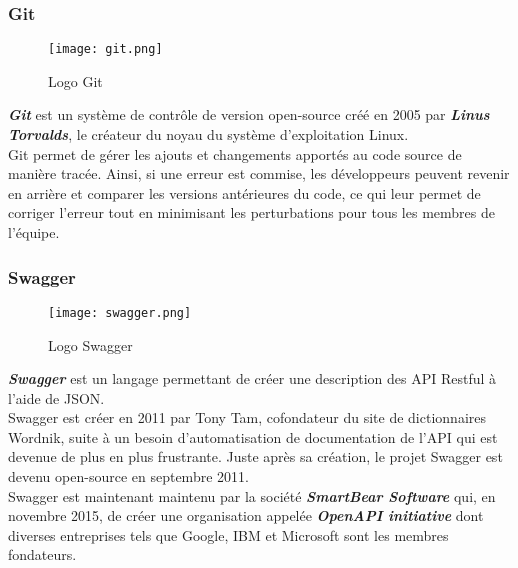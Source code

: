 \subsubsection{Git}
\vspace{1cm}
\begin{figure}[H]
    \centering
    \texttt{[image: git.png]}
    \vspace{1cm}
    \caption{Logo Git}
    \label{fig:git_logo}
\end{figure}
\textit{\textbf{Git}} est un système de contrôle de version open-source créé en 2005 par \textit{\textbf{Linus Torvalds}}, le créateur du noyau du système d'exploitation Linux.\\
\noindent Git permet de gérer les ajouts et changements apportés au code source de manière tracée. Ainsi, si une erreur est commise, les développeurs peuvent revenir en arrière et comparer les versions antérieures du code, ce qui leur permet de corriger l'erreur tout en minimisant les perturbations pour tous les membres de l'équipe.
\subsubsection{Swagger}
\vspace{1cm}
\begin{figure}[H]
    \centering
    \texttt{[image: swagger.png]}
    \vspace{1cm}
    \caption{Logo Swagger}
    \label{fig:swagger_logo}
\end{figure}
\textit{\textbf{Swagger}} est un langage permettant de créer une description des API Restful à l'aide de JSON.\\
\noindent Swagger est créer en 2011 par Tony Tam, cofondateur du site de dictionnaires Wordnik, suite à un besoin d'automatisation de documentation de l'API qui est devenue de plus en plus frustrante. Juste après sa création, le projet Swagger est devenu open-source en septembre 2011.\\
\noindent Swagger est maintenant maintenu par la société \textit{\textbf{SmartBear Software}} qui, en novembre 2015, de créer une organisation appelée \textit{\textbf{OpenAPI initiative}} dont diverses entreprises tels que Google, IBM et Microsoft sont les membres fondateurs.


